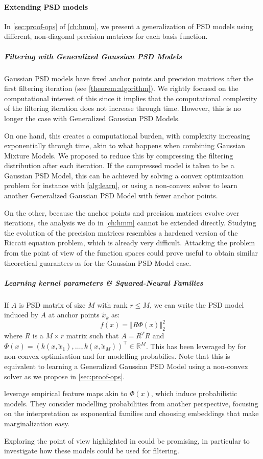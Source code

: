 \paragraph{Extending PSD models}
In \cref{sec:proof-ops} of \cref{ch:hmm}, we present a generalization of PSD models using different, non-diagonal precision matrices for each basis function.

\subparagraph{Filtering with Generalized Gaussian PSD Models} Gaussian PSD models have fixed anchor points and precision matrices after the first filtering iteration (see \cref{theorem:algorithm}). We rightly focused on the computational interest of this since it implies that the computational complexity of the filtering iteration does not increase through time. However, this is no longer the case with Generalized Gaussian PSD Models.

On one hand, this creates a computational burden, with complexity increasing exponentially through time, akin to what happens when combining Gaussian Mixture Models. We proposed to reduce this by compressing the filtering distribution after each iteration. If the compressed model is taken to be a Gaussian PSD Model, this can be achieved by solving a convex optimization problem for instance with \cref{alg:learn}, or using a non-convex solver to learn another Generalized Gaussian PSD Model with fewer anchor points.

On the other, because the anchor points and precision matrices evolve over iterations, the analysis we do in \cref{ch:hmm} cannot be extended directly. Studying the evolution of the precision matrices resembles a hardened version of the Riccati equation problem, which is already very difficult. Attacking the problem from the point of view of the function spaces could prove useful to obtain similar theoretical guarantees as for the Gaussian PSD Model case.

\subparagraph{Learning kernel parameters \& Squared-Neural Families} If $A$ is PSD matrix of size $M$ with rank $r \leq M$, we can write the PSD model induced by $A$ at anchor points $\tilde x_k$ as:
\begin{equation}
    f(x) = \left\Vert R\Phi(x)\right\Vert_2^2
\end{equation}
where $R$ is a $M \times r$ matrix such that $A = R^T R$ and $\Phi(x) = (k(x, \tilde x_1), \ldots, k(x, \tilde x_M))^\top\in\mathbb R^M$. This has been leveraged by \citet{gaspard} for non-convex optimisation and \citet{squared-neural-families} for modelling probabilies. Note that this is equivalent to learning a Generalized Gaussian PSD Model using a non-convex solver as we propose in \cref{sec:proof-ops}.

\cite{squared-neural-families} leverage empirical feature maps akin to $\Phi(x)$, which induce probabilistic models. They consider modelling probabilities from another perspective, focusing on the interpretation as exponential families and choosing embeddings that make marginalization easy.

Exploring the point of view highlighted in \cite{squared-neural-families} could be promising, in particular to investigate how these models could be used for filtering.
